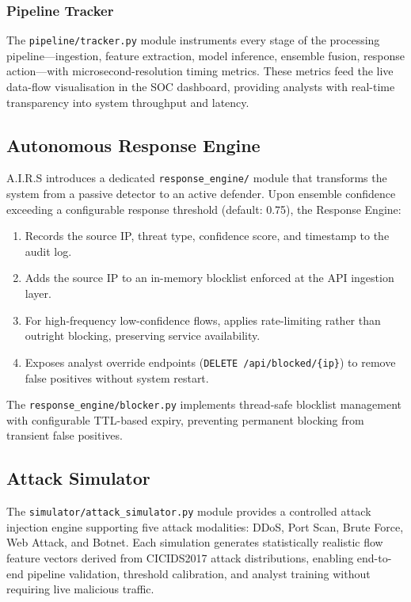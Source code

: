 \documentclass[conference]{IEEEtran}
\begin{document}
\subsubsection{Pipeline Tracker}
The \texttt{pipeline/tracker.py} module instruments every stage of the processing pipeline—ingestion, feature extraction, model inference, ensemble fusion, response action—with microsecond-resolution timing metrics. These metrics feed the live data-flow visualisation in the SOC dashboard, providing analysts with real-time transparency into system throughput and latency.

\subsection{Autonomous Response Engine}
A.I.R.S introduces a dedicated \texttt{response\_engine/} module that transforms the system from a passive detector to an active defender. Upon ensemble confidence exceeding a configurable response threshold (default: 0.75), the Response Engine:
\begin{enumerate}
    \item Records the source IP, threat type, confidence score, and timestamp to the audit log.
    \item Adds the source IP to an in-memory blocklist enforced at the API ingestion layer.
    \item For high-frequency low-confidence flows, applies rate-limiting rather than outright blocking, preserving service availability.
    \item Exposes analyst override endpoints (\texttt{DELETE /api/blocked/\{ip\}}) to remove false positives without system restart.
\end{enumerate}
The \texttt{response\_engine/blocker.py} implements thread-safe blocklist management with configurable TTL-based expiry, preventing permanent blocking from transient false positives.

\subsection{Attack Simulator}
The \texttt{simulator/attack\_simulator.py} module provides a controlled attack injection engine supporting five attack modalities: DDoS, Port Scan, Brute Force, Web Attack, and Botnet. Each simulation generates statistically realistic flow feature vectors derived from CICIDS2017 attack distributions, enabling end-to-end pipeline validation, threshold calibration, and analyst training without requiring live malicious traffic.
\end{document}
